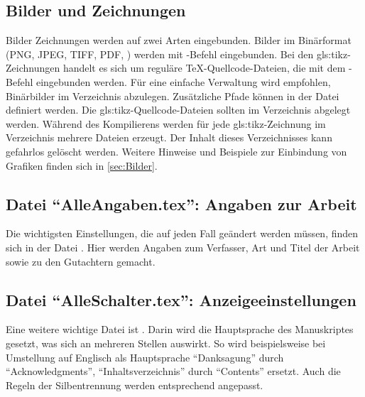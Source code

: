 \subsection[Bilder und Zeichnungen]{Bilder und Zeichnungen}%
%
%
\label{sec:BilderUndZeichnungen}
%
Bilder \bzw {}Zeichnungen werden auf zwei Arten eingebunden.
Bilder im Binärformat (PNG, JPEG, TIFF, PDF, \etc)
werden mit -Befehl eingebunden. 
Bei den \gls{gls:tikz}-Zeichnungen handelt es sich um reguläre TeX-Quellcode-Dateien,
die mit dem \verb++-Befehl eingebunden werden.
Für eine einfache Verwaltung wird empfohlen, Binärbilder im Verzeichnis  abzulegen.
Zusätzliche Pfade können in der Datei  definiert werden.
Die \gls{gls:tikz}-Quellcode-Dateien sollten im Verzeichnis  abgelegt werden.
Während des Kompilierens werden für jede \gls{gls:tikz}-Zeichnung im Verzeichnis  mehrere Dateien erzeugt.
Der Inhalt dieses Verzeichnisses kann gefahrlos gelöscht werden.
Weitere Hinweise und Beispiele zur Einbindung von Grafiken finden sich in \cref{sec:Bilder}.

\subsection[Datei \enquote{AlleAngaben.tex}: Angaben zur Arbeit]{Datei \enquote{AlleAngaben.tex}: Angaben zur Arbeit}%
%
%
\label{sec:Angaben}
%
Die wichtigsten Einstellungen, die auf jeden Fall geändert werden müssen,
finden sich in der Datei .
Hier werden \ua Angaben zum Verfasser, Art und Titel der Arbeit sowie zu den Gutachtern gemacht.

\subsection[Datei \enquote{AlleSchalter.tex}: Anzeigeeinstellungen]{Datei \enquote{AlleSchalter.tex}: Anzeigeeinstellungen}%
%
\label{sec:Schalter}
%
Eine weitere wichtige Datei ist .
Darin wird \ua die Hauptsprache des Manuskriptes gesetzt, was sich an mehreren Stellen auswirkt.
So wird beispielsweise bei Umstellung auf Englisch als Hauptsprache
\enquote{Danksagung} durch \enquote{Acknowledgments},
\enquote{Inhaltsverzeichnis} durch \enquote{Contents}
\usw ersetzt.
Auch die Regeln der Silbentrennung werden entsprechend angepasst.

